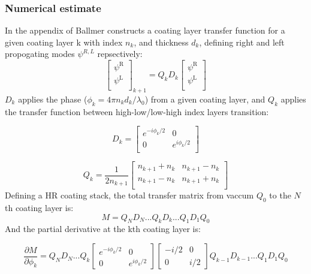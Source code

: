 \subsubsection{Numerical estimate}

In the appendix of \cite{ballmer:2015} Ballmer constructs a coating layer transfer function for a given coating layer k with index $n_k$, and thickness $d_k$, defining right and left propogating modes $\psi^{R,L}$ repsectively:
$$
  \left[ {\begin{array}{c}
   \psi^\mathrm{R} \\
   \psi^\mathrm{L} \\
  \end{array} } \right]_{k+1}
  =
%
Q_k D_k
%
 \left[{\begin{array}{c}
   \psi^\mathrm{R} \\
   \psi^\mathrm{L} \\
 \end{array}} \right]
$$
\noindent $D_k$ applies the phase ($\phi_k = 4\pi n_k d_k /\lambda_0$) from a given coating layer, and $Q_k$ applies the transfer function between high-low/low-high index layers transition:

\begin{equation}
D_k =
\left[ {\begin{array}{cc}
  e^{-i \phi_k / 2}& 0\\
 0 & e^{i \phi_k / 2}\\
\end{array} } \right]
\end{equation}

\begin{equation}
Q_k = \frac{1}{2n_{k+1}}
\left[ {\begin{array}{cc}
  n_{k+1} + n_k & n_{k+1} - n_k\\
 n_{k+1} - n_k & n_{k+1} + n_k\\
\end{array} } \right]
\end{equation}
\noindent Defining a HR coating stack, the total transfer matrix from vaccum $Q_0$ to the $N$th coating layer is:
\begin{equation}
	M = Q_N D_N ...Q_k D_k...Q_1D_1Q_0
\end{equation}
\noindent And the partial derivative at the kth coating layer is:

\begin{equation}
	\label{eq:partialM}
	\frac{\partial M}{\partial \phi_k} = Q_N D_N ...Q_{k} \begin{bmatrix} e^{-i \phi_k /2} & 0 \\ 0 & e^{i \phi_k/2} \end{bmatrix} \begin{bmatrix} -i /2 & 0 \\ 0 & i/2 \end{bmatrix} Q_{k-1} D_{k-1}...Q_1D_1Q_0
\end{equation}

